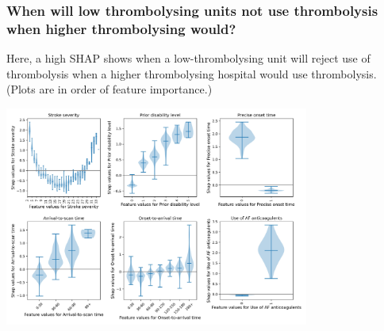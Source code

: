\documentclass{beamer}
\begin{document}
\begin{frame}
\frametitle{When will low thrombolysing units not use thrombolysis when higher thrombolysing would?}

\footnotesize{Here, a high SHAP shows when a low-thrombolysing unit will reject use of thrombolysis when a higher thrombolysing hospital would use thrombolysis. (Plots are in order of feature importance.)}

\begin{center}
\includegraphics[width=0.75\textwidth]{./images/xgb_predicting_difference_shap_violin.jpg}
\end{center}
\end{frame}
\end{document}
